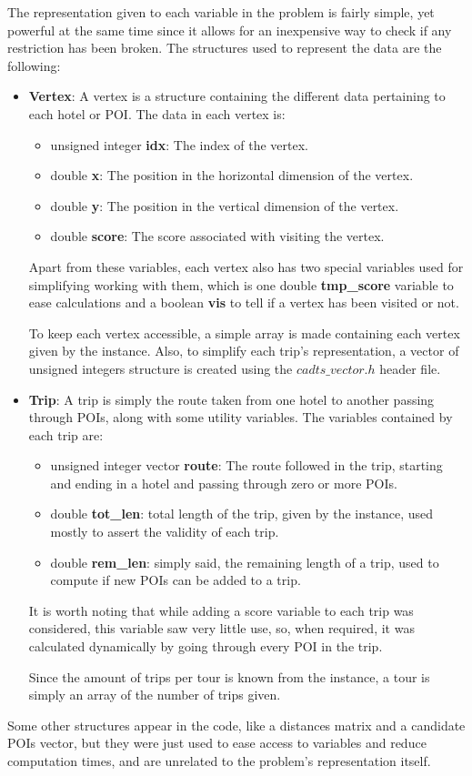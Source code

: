 The representation given to each variable in the problem is fairly simple, yet powerful at the same time since it allows for an inexpensive way to check if any restriction has been broken. The structures used to represent the data are the following:

\begin{itemize}
    \item \textbf{Vertex}: A vertex is a structure containing the different data pertaining to each hotel or POI. The data in each vertex is:
    \begin{itemize}
        \item unsigned integer \textbf{idx}: The index of the vertex.
        \item double \textbf{x}: The position in the horizontal dimension of the vertex.
        \item double \textbf{y}: The position in the vertical dimension of the vertex.
        \item double \textbf{score}: The score associated with visiting the vertex.
    \end{itemize}
    Apart from these variables, each vertex also has two special variables used for simplifying working with them, which is one double \textbf{tmp\_score} variable to ease calculations and a boolean \textbf{vis} to tell if a vertex has been visited or not.
    
    To keep each vertex accessible, a simple array is made containing each vertex given by the instance. Also, to simplify each trip's representation, a vector of unsigned integers structure is created using the $cadts\_vector.h$ header file.
    
    \item \textbf{Trip}: A trip is simply the route taken from one hotel to another passing through POIs, along with some utility variables. The variables contained by each trip are:
    \begin{itemize}
        \item unsigned integer vector \textbf{route}: The route followed in the trip, starting and ending in a hotel and passing through zero or more POIs.
        \item double \textbf{tot\_len}: total length of the trip, given by the instance, used mostly to assert the validity of each trip.
        \item double \textbf{rem\_len}: simply said, the remaining length of a trip, used to compute if new POIs can be added to a trip.
    \end{itemize}
    It is worth noting that while adding a score variable to each trip was considered, this variable saw very little use, so, when required, it was calculated dynamically by going through every POI in the trip.
    
    Since the amount of trips per tour is known from the instance, a tour is simply an array of the number of trips given.
\end{itemize}

Some other structures appear in the code, like a distances matrix and a candidate POIs vector, but they were just used to ease access to variables and reduce computation times, and are unrelated to the problem's representation itself.